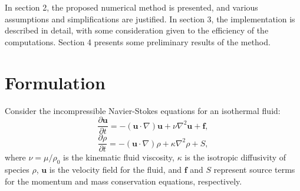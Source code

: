 \documentclass[12pt]{article}
\begin{document}
In section 2, the proposed numerical method is presented, and various assumptions and simplifications are justified. In section 3, the implementation is described in detail, with some consideration given to the efficiency of the computations. Section 4 presents some preliminary results of the method.


\section{Formulation}

Consider the incompressible Navier-Stokes equations for an isothermal fluid:
\begin{equation}
  \frac{\partial \mathbf{u}}{\partial t} = -(\mathbf{u} \cdot \nabla) \mathbf{u} + \nu \nabla^2 \mathbf{u} + \mathbf{f},
\end{equation}
\begin{equation}
  \frac{\partial \rho}{\partial t} = - (\mathbf{u} \cdot \nabla) \rho + \kappa \nabla^2 \rho + S,
\end{equation}
where $\nu = \mu / \rho_0$ is the kinematic fluid viscosity, $\kappa$ is the isotropic diffusivity of species $\rho$, $\mathbf{u}$ is the velocity field for the fluid, and $\mathbf{f}$ and $S$ represent source terms for the momentum and mass conservation equations, respectively.
\end{document}

